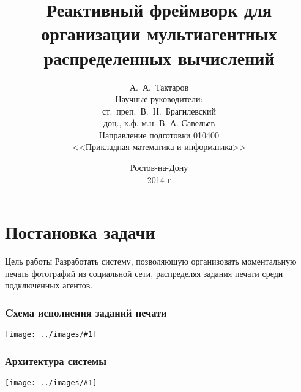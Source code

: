 \documentclass[utf-8]{beamer}
\title[Организация мультиагентных распределенных вычислений]{Реактивный фреймворк для организации мультиагентных распределенных вычислений}
\author[Тактаров~А.~А.]
{
  А.~А.~Тактаров \\[0.5cm]
  Научные руководители: \\
  ст.~преп.~В.~Н.~Брагилевский\\
  доц., к.ф.-м.н. В. А. Савельев\\[0.5cm]
  \small{Направление подготовки 010400 \\ <<Прикладная математика и информатика>>}
}
\date{ {\footnotesize Ростов-на-Дону \\ 2014 г} }
\newcommand{\slidegraphics}[1]{
\begin{center}
 \texttt{[image: ../images/\#1]}
\end{center}}
\begin{document}
\begin{frame}
  \titlepage
\end{frame}

\section{Постановка задачи}
\begin{frame}
  \begin{block}{Цель работы}
    Разработать систему, позволяющую организовать моментальную печать фотографий из социальной сети, распределяя
    задания печати среди подключенных агентов.
  \end{block}
\end{frame}

\begin{frame}
  \frametitle{Cхема исполнения заданий печати}
  \slidegraphics{print-schema.pdf}
\end{frame}

\begin{frame}
  \frametitle{Архитектура системы}
  \slidegraphics{architecture-simple.pdf}
\end{frame}





%   
%   
\end{document}
